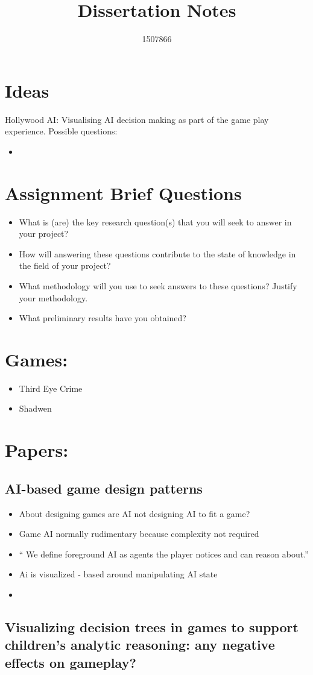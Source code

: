 \documentclass{scrartcl}
\title{Dissertation Notes }
\author{1507866}
\begin{document}
	
\maketitle

 \section{Ideas} 
  Hollywood AI: Visualising AI decision making as part of the game play experience. Possible questions:
 \begin{itemize}  
 	\item 
 \end{itemize}

\section{Assignment Brief Questions}
 \begin{itemize}  
	\item What is (are) the key research question(s) that you will seek to answer in
	your project?
	\item How will answering these questions contribute to the state of knowledge
	in the field of your project?
	\item What methodology will you use to seek answers to these questions?
	Justify your methodology.
	\item What preliminary results have you obtained?
\end{itemize}

\section{Games:}
 \begin{itemize}  
	\item Third Eye Crime
	\item Shadwen
\end{itemize}


 \section{Papers:}
 \subsection{AI-based game design patterns  \cite{treanor2015ai} }
 
 \begin{itemize}  
 	\item  About designing games are AI not designing AI to fit a game?
 	\item Game AI normally rudimentary because complexity not required 
 	\item `` We define foreground  AI as  agents  the  player  notices  and  can  reason  about.''
 	\item 	Ai is visualized - based around manipulating AI state 
 	\item
 \end{itemize}

 \subsection{Visualizing decision trees in games to support children's analytic reasoning: any negative effects on gameplay?  \cite{Haworth2010} }

 



	
\end{document}
